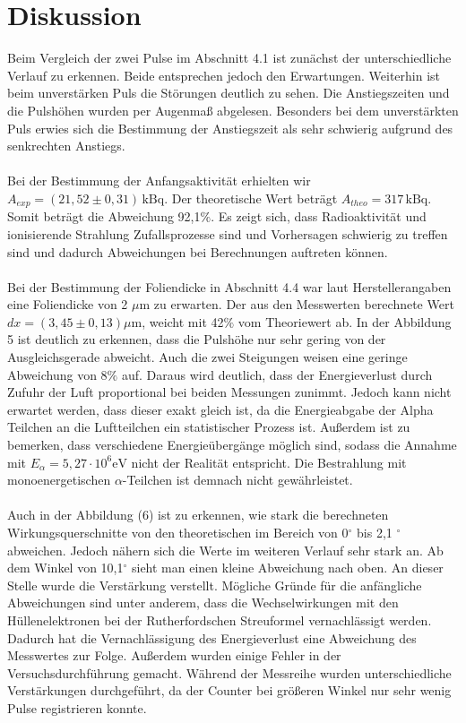 \documentclass{article}
\begin{document}
\section{Diskussion}
Beim Vergleich der zwei Pulse im Abschnitt 4.1 ist zunächst der unterschiedliche Verlauf zu erkennen. Beide entsprechen jedoch den Erwartungen. Weiterhin ist beim unverstärken Puls die Störungen deutlich zu sehen. Die Anstiegszeiten und die Pulshöhen wurden per Augenmaß abgelesen. Besonders bei dem unverstärkten Puls erwies sich die Bestimmung der Anstiegszeit als sehr schwierig aufgrund des senkrechten Anstiegs. \\\\
Bei der Bestimmung der Anfangsaktivität erhielten wir $A_{exp}=(21,52 \pm 0,31) \, \text{kBq}$. Der theoretische Wert beträgt $A_{theo}=317\, \text{kBq}$. Somit beträgt die Abweichung 92,1$\%$. Es zeigt sich, dass Radioaktivität und ionisierende Strahlung Zufallsprozesse sind und Vorhersagen schwierig zu treffen sind und dadurch Abweichungen bei Berechnungen auftreten können. \\\\
Bei der Bestimmung der Foliendicke in Abschnitt 4.4 war laut Herstellerangaben eine Foliendicke von 2 $\mu \text{m}$ zu erwarten. Der aus den Messwerten berechnete Wert $dx=(3,45\pm 0,13) \mu\text{m}$, weicht mit 42$\%$ vom Theoriewert ab. In der Abbildung 5 ist deutlich zu erkennen, dass die Pulshöhe nur sehr gering von der Ausgleichsgerade abweicht. Auch die zwei Steigungen weisen eine geringe Abweichung von 8$\%$ auf. Daraus wird deutlich, dass der Energieverlust durch Zufuhr der Luft proportional bei beiden Messungen zunimmt. Jedoch kann nicht erwartet werden, dass dieser exakt gleich ist, da die Energieabgabe der Alpha Teilchen an die Luftteilchen ein statistischer Prozess ist. Außerdem ist zu bemerken, dass  verschiedene Energieübergänge möglich sind, sodass die Annahme mit  $E_{\alpha}=5,27\cdot10^6 \text{eV}$ nicht der Realität entspricht. Die Bestrahlung mit monoenergetischen $\alpha$-Teilchen ist demnach nicht gewährleistet.\\\\
Auch in der Abbildung (6) ist zu erkennen, wie stark die berechneten Wirkungsquerschnitte von den theoretischen im Bereich von 0$^{\circ}$ bis 2,1 $^{\circ}$ abweichen. Jedoch nähern sich die Werte im weiteren Verlauf sehr stark an. Ab dem Winkel von 10,1$^{\circ}$ sieht man einen kleine Abweichung nach oben. An dieser Stelle wurde die Verstärkung verstellt.  Mögliche Gründe für die anfängliche Abweichungen sind unter anderem, dass die Wechselwirkungen mit den Hüllenelektronen bei der Rutherfordschen Streuformel vernachlässigt werden. Dadurch hat die Vernachlässigung des Energieverlust eine Abweichung des Messwertes zur Folge. Außerdem wurden einige Fehler in der Versuchsdurchführung gemacht. Während der Messreihe wurden unterschiedliche Verstärkungen durchgeführt, da der Counter bei größeren Winkel nur sehr wenig Pulse registrieren konnte. \\\\
\end{document}
